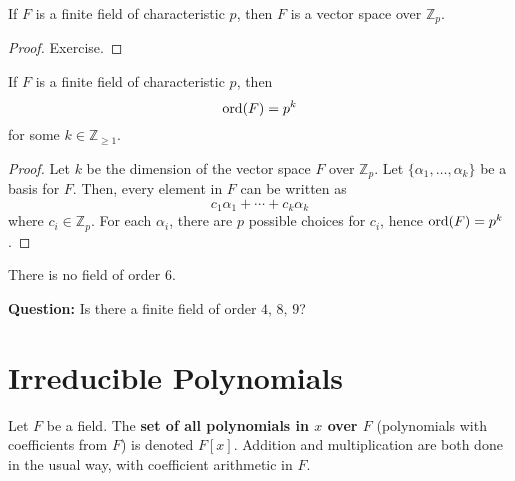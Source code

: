 \begin{thmbox}
    \begin{theorem}
        If $ F $ is a finite field of characteristic $ p $, then $ F $
        is a vector space over $ \mathbb{Z}_p $.
    \end{theorem}
\end{thmbox}

\begin{proof}
    Exercise.
\end{proof}

\begin{thmbox}
    \begin{theorem}
        If $ F $ is a finite field of characteristic $ p $, then
        \[ \operatorname{ord}(F)=p^k \]
        for some $ k\in\mathbb{Z}_{\geqslant 1} $.
    \end{theorem}
\end{thmbox}

\begin{proof}
    Let $ k $ be the dimension of the vector space $ F $ over $ \mathbb{Z}_p $.
    Let $ \{\alpha_1,\ldots ,\alpha_k\} $ be a basis for $ F $. Then, every element
    in $ F $ can be written as
    \[ c_1\alpha_1+\cdots+c_k\alpha_k \]
    where $ c_i\in\mathbb{Z}_p $. For each $ \alpha_i $, there are $ p $
    possible choices for $ c_i $, hence $ \operatorname{ord}(F)=p^k $.
\end{proof}

\begin{exbox}
    \begin{example}
        There is no field of order $ 6 $.
    \end{example}
\end{exbox}

\textbf{Question:} Is there a finite field of order $ 4,\,8,\,9 $?

\section{Irreducible Polynomials}

\begin{defbox}
    \begin{definition}
        Let $ F $ be a field. The \textbf{set of all polynomials in $ x $ over $ F $}
        (polynomials with coefficients from $ F $) is denoted $ F[x] $. Addition
        and multiplication are both done in the usual way, with coefficient arithmetic
        in $ F $.
    \end{definition}
\end{defbox}

